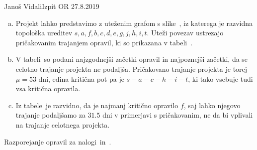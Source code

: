 \begin{naloga}{Janoš Vidali}{Izpit OR 27.8.2019}
\begin{odgovor}
\begin{enumerate}[(a)]
\item Projekt lahko predstavimo z uteženim grafom s slike~\fig,
iz katerega je razvidna topološka ureditev
$s, a, f, b, c, d, e, g, j, h, i, t$.
Uteži povezav ustrezajo pričakovanim trajanjem opravil,
ki so prikazana v tabeli~.

\item V tabeli~
so podani najzgodnejši začetki opravil in najpoznejši začetki,
da se celotno trajanje projekta ne podaljša.
Pričakovano trajanje projekta je torej $\mu = 53$ dni,
edina kritična pot pa je $s - a - c - h - i - t$,
ki tako vsebuje tudi vsa kritična opravila.

\item Iz tabele~ je razvidno,
da je najmanj kritično opravilo $f$,
saj lahko njegovo trajanje
podaljšamo za $31.5$ dni v primerjavi s pričakovanim,
ne da bi vplivali na trajanje celotnega projekta.
\end{enumerate}
%
\begin{slika}
\makebox[\textwidth][c]{
\pgfslika
}
\end{slika}
%
\begin{tabela}
\caption{Razporejanje opravil za nalogi~\nal in~\nal[dirka2].}
\end{tabela}
\end{odgovor}
\end{naloga}
